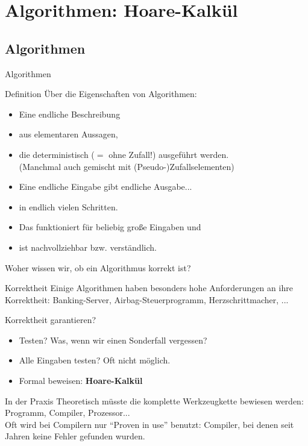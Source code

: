\renewcommand{\assert}[1]{\hoareassert{#1}}
\renewcommand{\kw}[1]{\textbf{#1}}

\section{Algorithmen: Hoare-Kalkül}

\subsection{Algorithmen}
\begin{frame}{Algorithmen}
	\begin{block}{Definition}
		Über die Eigenschaften von Algorithmen:
		\begin{itemize}[<+->]
			\item Eine endliche Beschreibung
			\item aus elementaren Aussagen, 
			\item die deterministisch ($=$ ohne Zufall!) ausgeführt werden.\\
				{\small (Manchmal auch gemischt mit (Pseudo-)Zufallselementen)}
			\item Eine endliche Eingabe gibt endliche Ausgabe...
			\item in endlich vielen Schritten.
			\item Das funktioniert für beliebig große Eingaben und
			\item ist nachvollziehbar bzw. verständlich.
		\end{itemize}
	\end{block}
	\pause[8]
	Woher wissen wir, ob ein Algorithmus korrekt ist?
\end{frame}

\begin{frame}{Korrektheit}
	Einige Algorithmen haben besonders hohe Anforderungen an ihre Korrektheit:
	Banking-Server, Airbag-Steuerprogramm, Herzschrittmacher, ...
	\bigskip

	\pause
	Korrektheit garantieren?
	\begin{itemize}
		\item Testen? Was, wenn wir einen Sonderfall vergessen? \pause
		\item Alle Eingaben testen? Oft nicht möglich. \pause
		\item Formal beweisen: \textbf{Hoare-Kalkül} \pause
	\end{itemize}
	
	\begin{block}{In der Praxis}
		Theoretisch müsste die komplette Werkzeugkette bewiesen werden:
		Programm, Compiler, Prozessor...\\
		Oft wird bei Compilern nur “Proven in use” benutzt: Compiler, bei
		denen seit Jahren keine Fehler gefunden wurden.
	\end{block}
	
\end{frame}

